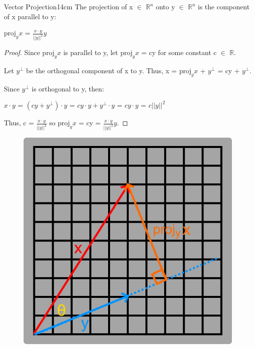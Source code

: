     \vspace{0.5cm}



    \begin{wtheorem}{Vector Projection}{14cm}
        The projection of x $\in$ $\mathbb{R}^n$ onto y $\in$ $\mathbb{R}^n$
        is the component of x parallel to y:

        \hspace{0.5cm}
        $\text{proj}_yx$ = $\frac{x \cdot y}{||y||^2}y$
    \end{wtheorem}

    \begin{proof}
        Since $\text{proj}_yx$ is parallel to y, let
        $\text{proj}_yx$ = cy for some constant c $\in$ $\mathbb{R}$.

        Let $y^{\perp}$ be the orthogonal component of x to y.
        Thus, x = $\text{proj}_yx$ + $y^{\perp}$ = cy + $y^{\perp}$.

        Since $y^{\perp}$ is orthogonal to y, then:

        \hspace{0.5cm}
        $x \cdot y$
        = $(cy + y^{\perp}) \cdot y$
        = $cy \cdot y + y^{\perp} \cdot y$
        = $c y \cdot y$
        = $c||y||^2$

        Thus, c = $\frac{x \cdot y}{||y||^2}$
        so $\text{proj}_yx$ = cy = $\frac{x \cdot y}{||y||^2}y$.
    \end{proof}

    \begin{figure}[h]
        \centering
        \includegraphics[scale=0.4]{Images/1.1.7.png}
    \end{figure}

